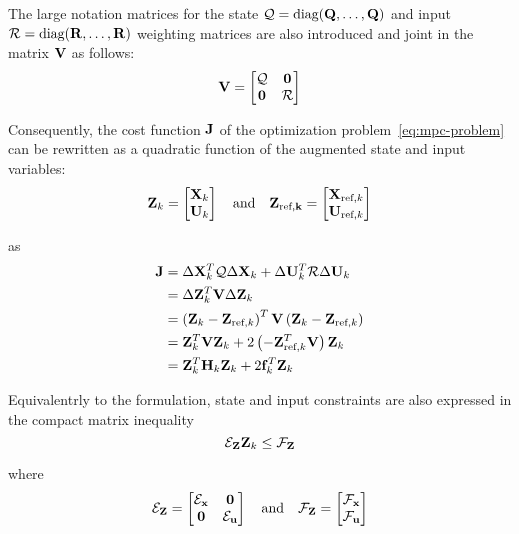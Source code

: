 \documentclass[../main.tex]{subfiles}
\begin{document}
The large notation matrices for the state $\mathcal{Q} = \text{diag}(\mathbf{Q},
\ldots, \mathbf{Q})$ and input $\mathcal{R} = \text{diag}(\mathbf{R}, \ldots, \mathbf{R})$
weighting matrices are also introduced and joint in the matrix $\mathbf{V}$ as
follows:
\begin{equation*}
	\mathbf{V} = \begin{bmatrix}
		\mathcal{Q} & \mathbf{0}\\
		\mathbf{0} & \mathcal{R}
	\end{bmatrix}
\end{equation*}

Consequently, the cost function $\mathbf{J}$ of the optimization
problem~\ref{eq:mpc-problem} can be rewritten as a quadratic function of the
augmented state and input variables:
\begin{equation*}
	\mathbf{Z}_k = \begin{bmatrix}
		\mathbf{X}_k\\
		\mathbf{U}_k
	\end{bmatrix}
	\quad \text{and} \quad
	\mathbf{Z_{\text{ref},k}} = \begin{bmatrix}
		\mathbf{X}_{\text{ref},k}\\
		\mathbf{U}_{\text{ref},k}
	\end{bmatrix}
\end{equation*}

as
\begin{equation*}
	\begin{aligned}
		\mathbf{J} &= \Delta \mathbf{X}_k^T \mathcal{Q} \Delta \mathbf{X}_k + \Delta \mathbf{U}_k^T
	\mathcal{R} \Delta \mathbf{U}_k\\
				&= \Delta \mathbf{Z}_k^T \mathbf{V} \Delta \mathbf{Z}_k\\
				&= \left( \mathbf{Z}_k - \mathbf{Z}_{\text{ref},k} \right)^T \mathbf{V}
				\left( \mathbf{Z}_k - \mathbf{Z}_{\text{ref},k} \right)\\
				&= \mathbf{Z}_k^T \mathbf{V} \mathbf{Z}_k + 2 \left( -
				\mathbf{Z}_{\text{ref},k}^T \mathbf{V} \right) \mathbf{Z}_k\\
				&= \mathbf{Z}_k^T \mathbf{H}_k \mathbf{Z}_k + 2 \mathbf{f}_k^T \mathbf{Z}_k
	\end{aligned}
\end{equation*}

Equivalentrly to the  formulation, state and input constraints are
also expressed in the compact matrix inequality
\begin{equation*}
	\mathcal{E}_{\mathbf{Z}} \mathbf{Z}_k \leq \mathcal{F}_{\mathbf{Z}}
\end{equation*}

where
\begin{equation*}
	\mathcal{E}_{\mathbf{Z}} = \begin{bmatrix}
		\mathcal{E}_{\mathbf{x}} & \mathbf{0}\\
		\mathbf{0} & \mathcal{E}_{\mathbf{u}}
	\end{bmatrix}
	\quad \text{and} \quad
	\mathcal{F}_{\mathbf{Z}} = \begin{bmatrix}
		\mathcal{F}_{\mathbf{x}}\\
		\mathcal{F}_{\mathbf{u}}
	\end{bmatrix}
\end{equation*}
\end{document}
